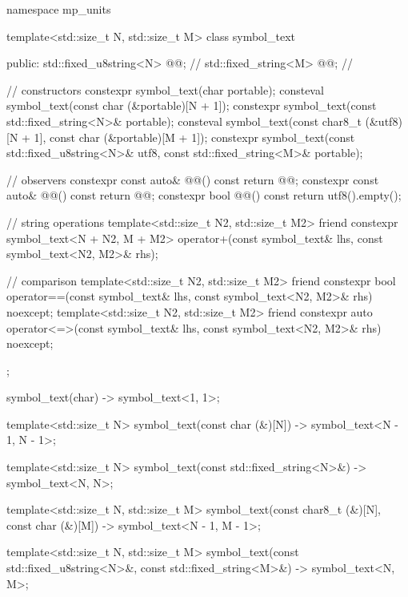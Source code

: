 \begin{codeblock}
namespace mp_units {

template<std::size_t N, std::size_t M>
class symbol_text {
public:
  std::fixed_u8string<N> @@;    // \expos
  std::fixed_string<M> @@;  // \expos

  // constructors
  constexpr symbol_text(char portable);
  consteval symbol_text(const char (&portable)[N + 1]);
  constexpr symbol_text(const std::fixed_string<N>& portable);
  consteval symbol_text(const char8_t (&utf8)[N + 1], const char (&portable)[M + 1]);
  constexpr symbol_text(const std::fixed_u8string<N>& utf8,
                        const std::fixed_string<M>& portable);

  // observers
  constexpr const auto& @@() const { return @@; }
  constexpr const auto& @@() const { return @@; }
  constexpr bool @@() const { return utf8().empty(); }

  // string operations
  template<std::size_t N2, std::size_t M2>
  friend constexpr symbol_text<N + N2, M + M2> operator+(const symbol_text& lhs,
                                                         const symbol_text<N2, M2>& rhs);

  // comparison
  template<std::size_t N2, std::size_t M2>
  friend constexpr bool operator==(const symbol_text& lhs,
                                   const symbol_text<N2, M2>& rhs) noexcept;
  template<std::size_t N2, std::size_t M2>
  friend constexpr auto operator<=>(const symbol_text& lhs,
                                    const symbol_text<N2, M2>& rhs) noexcept;
};

symbol_text(char) -> symbol_text<1, 1>;

template<std::size_t N>
symbol_text(const char (&)[N]) -> symbol_text<N - 1, N - 1>;

template<std::size_t N>
symbol_text(const std::fixed_string<N>&) -> symbol_text<N, N>;

template<std::size_t N, std::size_t M>
symbol_text(const char8_t (&)[N], const char (&)[M]) -> symbol_text<N - 1, M - 1>;

template<std::size_t N, std::size_t M>
symbol_text(const std::fixed_u8string<N>&, const std::fixed_string<M>&) -> symbol_text<N, M>;

}
\end{codeblock}

